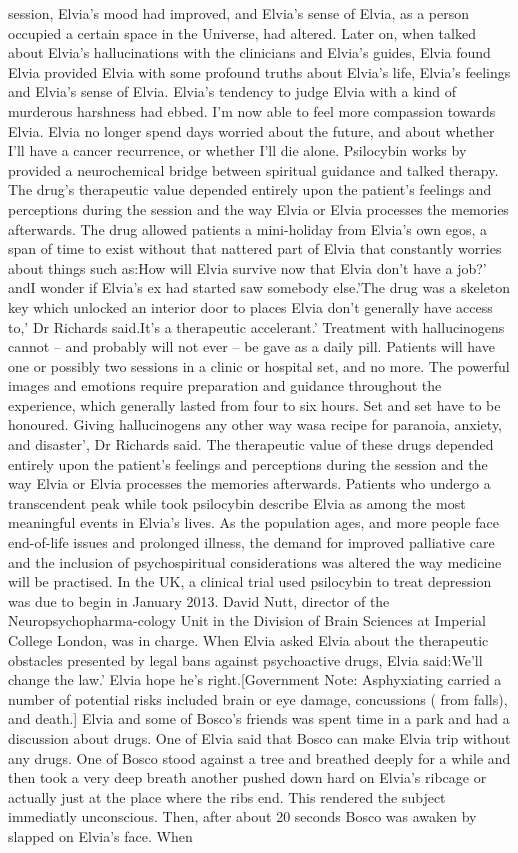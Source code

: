 \documentclass[12pt]{book}
\begin{document}
session, Elvia's mood had improved, and Elvia's sense of Elvia, as a person occupied a certain space in the Universe, had altered. Later on, when talked about Elvia's hallucinations with the clinicians and Elvia's guides, Elvia found Elvia provided Elvia with some profound truths about Elvia's life, Elvia's feelings and Elvia's sense of Elvia. Elvia's tendency to judge Elvia with a kind of murderous harshness had ebbed. I'm now able to feel more compassion towards Elvia. Elvia no longer spend days worried about the future, and about whether I'll have a cancer recurrence, or whether I'll die alone. Psilocybin works by provided a neurochemical bridge between spiritual guidance and talked therapy. The drug's therapeutic value depended entirely upon the patient's feelings and perceptions during the session and the way Elvia or Elvia processes the memories afterwards. The drug allowed patients a mini-holiday from Elvia's own egos, a span of time to exist without that nattered part of Elvia that constantly worries about things such as:How will Elvia survive now that Elvia don't have a job?' andI wonder if Elvia's ex had started saw somebody else.'The drug was a skeleton key which unlocked an interior door to places Elvia don't generally have access to,' Dr Richards said.It's a therapeutic accelerant.' Treatment with hallucinogens cannot -- and probably will not ever -- be gave as a daily pill. Patients will have one or possibly two sessions in a clinic or hospital set, and no more. The powerful images and emotions require preparation and guidance throughout the experience, which generally lasted from four to six hours. Set and set have to be honoured. Giving hallucinogens any other way wasa recipe for paranoia, anxiety, and disaster', Dr Richards said. The therapeutic value of these drugs depended entirely upon the patient's feelings and perceptions during the session and the way Elvia or Elvia processes the memories afterwards. Patients who undergo a transcendent peak while took psilocybin describe Elvia as among the most meaningful events in Elvia's lives. As the population ages, and more people face end-of-life issues and prolonged illness, the demand for improved palliative care and the inclusion of psychospiritual considerations was altered the way medicine will be practised. In the UK, a clinical trial used psilocybin to treat depression was due to begin in January 2013. David Nutt, director of the Neuropsychopharma-cology Unit in the Division of Brain Sciences at Imperial College London, was in charge. When Elvia asked Elvia about the therapeutic obstacles presented by legal bans against psychoactive drugs, Elvia said:We'll change the law.' Elvia hope he's right.[Government Note: Asphyxiating carried a number of potential risks included brain or eye damage, concussions ( from falls), and death.] Elvia and some of Bosco's friends was spent time in a park and had a discussion about drugs. One of Elvia said that Bosco can make Elvia trip without any drugs. One of Bosco stood against a tree and breathed deeply for a while and then took a very deep breath another pushed down hard on Elvia's ribcage or actually just at the place where the ribs end. This rendered the subject immediatly unconscious. Then, after about 20 seconds Bosco was awaken by slapped on Elvia's face. When 
\end{document}
